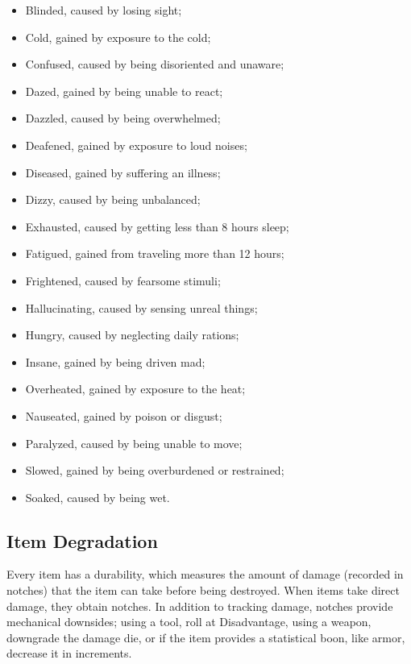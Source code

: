 \documentclass[twoside]{article}
\begin{document}
\begin{itemize}[nosep]
\item Blinded, caused by losing sight;
\item Cold, gained by exposure to the cold;
\item Confused, caused by being disoriented and unaware;
\item Dazed, gained by being unable to react;
\item Dazzled, caused by being overwhelmed;
\item Deafened, gained by exposure to loud noises;
\item Diseased, gained by suffering an illness;
\item Dizzy, caused by being unbalanced;
\item Exhausted, caused by getting less than 8 hours sleep;
\item Fatigued, gained from traveling more than 12 hours;
\item Frightened, caused by fearsome stimuli;
\item Hallucinating, caused by sensing unreal things;
\item Hungry, caused by neglecting daily rations;
\item Insane, gained by being driven mad;
\item Overheated, gained by exposure to the heat;
\item Nauseated, gained by poison or disgust;
\item Paralyzed, caused by being unable to move;
\item Slowed, gained by being overburdened or restrained;
\item Soaked, caused by being wet.
\end{itemize}

\subsection*{Item Degradation}

Every item has a durability, which measures the amount of damage (recorded in notches) that the item can take before being destroyed. When items take direct damage, they obtain notches. In addition to tracking damage, notches provide mechanical downsides; using a tool, roll at Disadvantage, using a weapon, downgrade the damage die, or if the item provides a statistical boon, like armor, decrease it in increments.

\bigbreak
\end{document}
